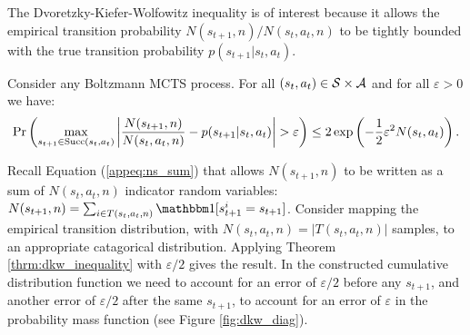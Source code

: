             The Dvoretzky-Kiefer-Wolfowitz inequality is of interest because it allows the empirical transition probability $N(s_{t+1},n)/N(s_t,a_t,n)$ to be tightly bounded with the true transition probability $p(s_{t+1}|s_t,a_t)$. 
            \begin{corollary} \label{cor:bound_transition_distribution}
                Consider any Boltzmann MCTS process. For all $(s_t,a_t)\in\mathcal{S}\times\mathcal{A}$ and for all $\varepsilon >0$ we have:
                \begin{align}
                    \Pr\left(\max_{s_{t+1}\in{\textnormal{Succ}(s_t,a_t)}}\left| \frac{N(s_{t+1},n)}{N(s_t,a_t,n)} - p(s_{t+1}|s_t,a_t) \right| > \varepsilon \right) \leq 2 \exp\left(-\frac{1}{2}\varepsilon^2 N(s_t,a_t) \right).
                \end{align}
            \end{corollary}
            \begin{proofoutline}
                Recall Equation (\ref{appeq:ns_sum}) that allows $N(s_{t+1},n)$ to be written as a sum of $N(s_t,a_t,n)$ indicator random variables: $N(s_{t+1},n) = \sum_{i\in T(s_t,a_t,n)} \one[s^i_{t+1} = s_{t+1}]$. Consider mapping the empirical transition distribution, with $N(s_t,a_t,n)=|T(s_t,a_t,n)|$ samples, to an appropriate catagorical distribution. Applying Theorem \ref{thrm:dkw_inequality} with $\varepsilon/2$ gives the result.   In the constructed cumulative distribution function we need to account for an error of $\varepsilon/2$ before any $s_{t+1}$, and another error of $\varepsilon/2$ after the same $s_{t+1}$, to account for an error of $\varepsilon$ in the probability mass function (see Figure \ref{fig:dkw_diag}).
            \end{proofoutline}









            










